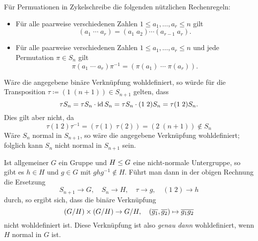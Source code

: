 \section{}





\subsection{}

\begin{remark}
  Für Permuationen in Zykelschreibe die folgenden nützlichen Rechenregeln:
  \begin{itemize}
    \item
      Für alle paarweise verschiedenen Zahlen $1 \leq a_1, \dotsc, a_r \leq n$ gilt
      \[
          (a_1 \; \dotsm \; a_r)
        = (a_1 \; a_2) \dotsm (a_{r-1} \; a_r).
      \]
    \item
      Für alle paarweise verschiedenen Zahlen $1 \leq a_1, \dotsc, a_r \leq n$ und jede Permutation $\pi \in S_n$ gilt
      \[
          \pi (a_1 \; \dotsm \; a_r) \pi^{-1}
        = ( \pi(a_1) \; \dotsm \; \pi(a_r) ).
      \]
  \end{itemize}
\end{remark}


Wäre die angegebene binäre Verknüpfung wohldefiniert, so würde für die Transposition $\tau \coloneqq (1 \; (n+1)) \in S_{n+1}$ gelten, dass
\[
    \tau S_n
  =  \tau S_n \cdot \operatorname{id} S_n
  =  \tau S_n \cdot (1 \; 2) S_n
  =  \tau(1 \; 2) S_n.
\]
Dies gilt aber nicht, da
\[
          \tau (1 \; 2) \tau^{-1}
  =       ( \tau(1) \; \tau(2) )
  =       (2 \; (n+1))
  \notin  S_n
\]
Wäre $S_n$ normal in $S_{n+1}$, so wäre die angegebene Verknüpfung wohldefiniert;
folglich kann $S_n$ nicht normal in $S_{n+1}$ sein.

\begin{remark}
  Ist allgemeiner $G$ ein Gruppe und $H \leq G$ eine nicht-normale Untergruppe, so gibt es $h \in H$ und $g \in G$ mit $g h g^{-1} \notin H$.
  Führt man dann in der obigen Rechnung die Ersetzung
  \[
    S_{n+1}   \to G,
    \quad
    S_n       \to H,
    \quad
    \tau      \to g,
    \quad
    (1 \; 2)  \to h
  \]
  durch, so ergibt sich, dass die binäre Verknüpfung
  \[
            (G/H) \times (G/H)
    \to     G/H,
    \quad   (\overline{g_1}, \overline{g_2})
    \mapsto \overline{g_1 g_2}
  \]
  nicht wohldefiniert ist.
  Diese Verknüpfung ist also \emph{genau dann} wohldefiniert, wenn $H$ normal in $G$ ist.
\end{remark}





